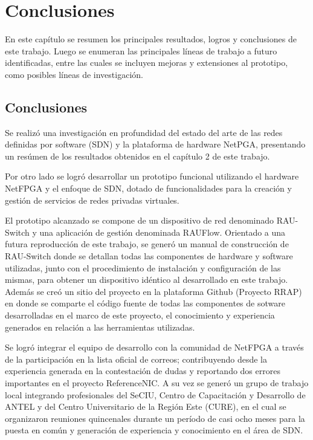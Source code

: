 \chapter{Conclusiones}

\ifpdf
    \graphicspath{{Chapter8/Figs/Raster/}{Chapter8/Figs/PDF/}{Chapter8/Figs/}}
\else
    \graphicspath{{Chapter8/Figs/Vector/}{Chapter8/Figs/}}
\fi

En este cap\'itulo se resumen los principales resultados, logros y conclusiones de este trabajo. Luego se enumeran las principales l\'ineas de trabajo a futuro identificadas, entre las cuales se incluyen mejoras y extensiones al prototipo, como posibles l\'ineas de investigaci\'on.

\section{Conclusiones}
Se realiz\'o una investigaci\'on en profundidad del estado del arte de las redes definidas por software  
 (SDN) y la plataforma de hardware NetPGA, presentando un res\'umen de los resultados obtenidos en el cap\'itulo 2 de este trabajo.

Por otro lado se logr\'o desarrollar un prototipo funcional utilizando el hardware NetFPGA y el enfoque de SDN, dotado de funcionalidades para la creaci\'on y gesti\'on de servicios de redes privadas virtuales. 

El prototipo alcanzado se compone de un dispositivo de red denominado RAU-Switch y una aplicaci\'on de gesti\'on denominada RAUFlow. Orientado a una futura reproducci\'on de este trabajo, se gener\'o un manual de construcci\'on de RAU-Switch donde se detallan todas las componentes de hardware y software utilizadas, junto con el procedimiento de instalaci\'on y configuraci\'on de las mismas, para obtener un dispositivo id\'entico al desarrollado en este trabajo. Adem\'as se cre\'o un sitio del proyecto en la plataforma Github (Proyecto RRAP\cite{GitRRAP}) en donde se comparte el c\'odigo fuente de todas las componentes de sotware desarrolladas en el marco de este proyecto, el conocimiento y experiencia generados en relaci\'on a las herramientas utilizadas. 

Se logr\'o integrar el equipo de desarrollo con la comunidad de NetFPGA a trav\'es de la participaci\'on en la lista oficial de correos; contribuyendo desde la experiencia generada en la contestaci\'on de dudas y reportando dos errores importantes en el proyecto ReferenceNIC. A su vez se gener\'o un grupo de trabajo local integrando profesionales del SeCIU, Centro de Capacitaci\'on y Desarrollo de ANTEL y del Centro Universitario de la Regi\'on Este (CURE), en el cual se organizaron reuniones quincenales durante un per\'iodo de casi ocho meses para la puesta en com\'un y generaci\'on de experiencia y conocimiento en el \'area de SDN.

